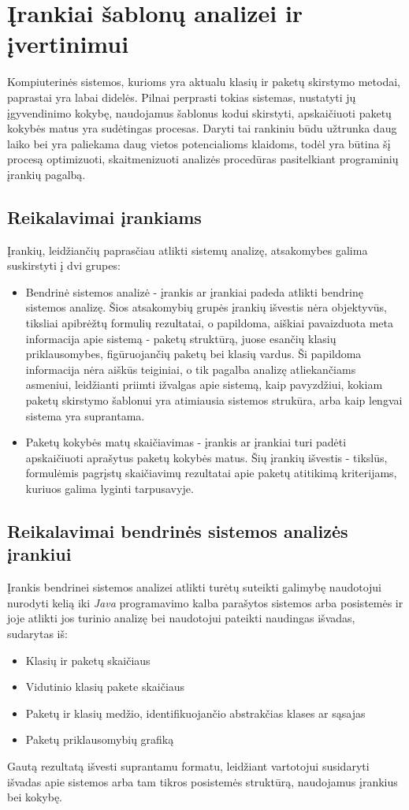 \section{Įrankiai šablonų analizei ir įvertinimui}
Kompiuterinės sistemos, kurioms yra aktualu klasių ir paketų skirstymo metodai, paprastai yra labai didelės.
Pilnai perprasti tokias sistemas, nustatyti jų įgyvendinimo kokybę, naudojamus šablonus kodui skirstyti,
apskaičiuoti paketų kokybės matus yra sudėtingas procesas.
Daryti tai rankiniu būdu užtrunka daug laiko bei yra paliekama daug vietos potencialioms klaidoms,
todėl yra būtina šį procesą optimizuoti, skaitmenizuoti analizės procedūras pasitelkiant
 programinių įrankių pagalbą.

\subsection{Reikalavimai įrankiams}
Įrankių, leidžiančių paprasčiau atlikti sistemų analizę, atsakomybes galima suskirstyti į dvi grupes:
\begin{itemize}
    \item Bendrinė sistemos analizė - įrankis ar įrankiai padeda atlikti bendrinę sistemos analizę.
    Šios atsakomybių grupės įrankių išvestis nėra objektyvūs, tiksliai apibrėžtų formulių rezultatai, o papildoma, aiškiai
    pavaizduota meta informacija apie sistemą - paketų struktūrą, juose esančių klasių priklausomybes, figūruojančių paketų bei klasių vardus.
    Ši papildoma informacija nėra aiškūs teiginiai, o tik pagalba analizę atliekančiams asmeniui, leidžianti priimti ižvalgas apie sistemą,
    kaip pavyzdžiui, kokiam paketų skirstymo šablonui yra atimiausia sistemos strukūra, arba kaip lengvai sistema yra suprantama.
    \item Paketų kokybės matų skaičiavimas - įrankis ar įrankiai turi padėti apskaičiuoti aprašytus paketų kokybės matus.
    Šių įrankių išvestis - tikslūs, formulėmis pagrįstų skaičiavimų rezultatai apie paketų atitikimą kriterijams, kuriuos galima lyginti tarpusavyje.
\end{itemize}

\subsection{Reikalavimai bendrinės sistemos analizės įrankiui}
Įrankis bendrinei sistemos analizei atlikti turėtų suteikti galimybę naudotojui nurodyti kelią iki \textit{Java} programavimo kalba parašytos sistemos arba posistemės ir joje
atlikti jos turinio analizę bei naudotojui pateikti naudingas išvadas, sudarytas iš:
\begin{itemize}
    \item Klasių ir paketų skaičiaus
    \item Vidutinio klasių pakete skaičiaus
    \item Paketų ir klasių medžio, identifikuojančio abstrakčias klases ar sąsajas
    \item Paketų priklausomybių grafiką
\end{itemize}
Gautą rezultatą išvesti suprantamu formatu, leidžiant vartotojui susidaryti išvadas apie sistemos arba tam tikros
posistemės struktūrą, naudojamus įrankius bei kokybę.


